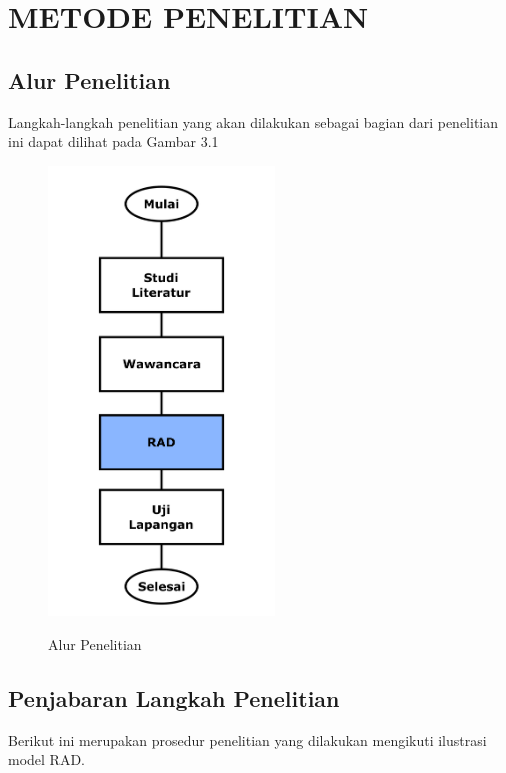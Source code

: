 \chapter{METODE PENELITIAN}

%
\vspace{4.5pt}

\begin{flushleft}
   \begin{justify}
      \section{Alur Penelitian}
      Langkah-langkah penelitian yang akan dilakukan sebagai bagian dari penelitian ini dapat dilihat pada Gambar 3.1
      \begin{figure}[ht]
         \centering
        
\includegraphics[width=6cm]{images/alur_penelitian.png}\\
         \caption{Alur Penelitian}
     \end{figure}

   \section{Penjabaran Langkah Penelitian}
    Berikut ini merupakan prosedur penelitian yang dilakukan mengikuti ilustrasi model RAD.

\end{justify}
\end{flushleft}
